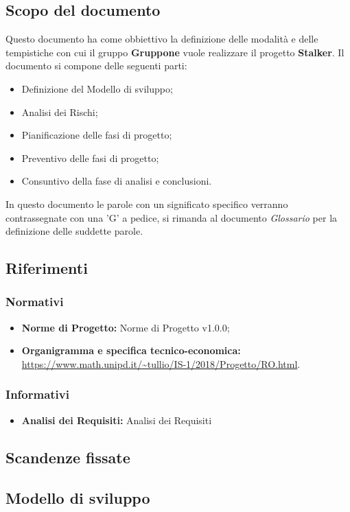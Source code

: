 \documentclass[../piano-di-progetto.tex]{subfiles}
\begin{document}
	\subsection{Scopo del documento}
  \label{subsec:scopo_del_documento}
  Questo documento ha come obbiettivo la definizione delle modalità e delle tempistiche con cui il gruppo \textbf{Gruppone} vuole realizzare il progetto \textbf{Stalker}.
  Il documento si compone delle seguenti parti:
  \begin{itemize}
      \item Definizione del Modello di sviluppo;
      \item Analisi dei Rischi;
      \item Pianificazione delle fasi di progetto;
      \item Preventivo delle fasi di progetto;
      \item Consuntivo della fase di analisi e conclusioni.
  \end{itemize}
  In questo documento le parole con un significato specifico verranno contrassegnate con una 'G' a pedice, si rimanda al documento \textit{Glossario} per la definizione delle suddette parole.
  \subsection{Riferimenti}
  \label{subsec:riferimenti}

    \subsubsection{Normativi}
    \label{subsubsec:normativi}
    \begin{itemize}
      \item  \textbf{Norme di Progetto:} Norme di Progetto v1.0.0;
      \item  \textbf{Organigramma e specifica tecnico-economica:} \url{https://www.math.unipd.it/~tullio/IS-1/2018/Progetto/RO.html}.
    \end{itemize}
    \subsubsection{Informativi}
    \begin{itemize}
      \item \textbf{Analisi dei Requisiti:} Analisi dei Requisiti 
    \end{itemize}
    \label{subsubsec:informativi}
  \subsection{Scandenze fissate}
  \label{subsubsec:scadenze_fissate}
  \subsection{Modello di sviluppo}
  \label{subsec:modello_di_sviluppo}
  
  
\end{document}
